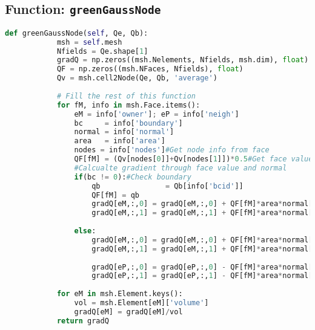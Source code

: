 \documentclass{article}
\begin{document}
\subsection*{Function: \texttt{greenGaussNode}}
\begin{lstlisting}[language=Python]
    def greenGaussNode(self, Qe, Qb):
            msh = self.mesh
            Nfields = Qe.shape[1]
            gradQ = np.zeros((msh.Nelements, Nfields, msh.dim), float)
            QF = np.zeros((msh.NFaces, Nfields), float)
            Qv = msh.cell2Node(Qe, Qb, 'average')
            
            # Fill the rest of this function
            for fM, info in msh.Face.items():
                eM = info['owner']; eP = info['neigh']
                bc     = info['boundary']
                normal = info['normal']
                area   = info['area']
                nodes = info['nodes']#Get node info from face
                QF[fM] = (Qv[nodes[0]]+Qv[nodes[1]])*0.5#Get face value through nodes
                #Calcualte gradient through face value and normal
                if(bc != 0):#Check boundary
                    qb               = Qb[info['bcid']]
                    QF[fM] = qb
                    gradQ[eM,:,0] = gradQ[eM,:,0] + QF[fM]*area*normal[0]
                    gradQ[eM,:,1] = gradQ[eM,:,1] + QF[fM]*area*normal[1]
                    
                else:
                    gradQ[eM,:,0] = gradQ[eM,:,0] + QF[fM]*area*normal[0]
                    gradQ[eM,:,1] = gradQ[eM,:,1] + QF[fM]*area*normal[1]
                                
                    gradQ[eP,:,0] = gradQ[eP,:,0] - QF[fM]*area*normal[0]
                    gradQ[eP,:,1] = gradQ[eP,:,1] - QF[fM]*area*normal[1]
            
            for eM in msh.Element.keys():
                vol = msh.Element[eM]['volume']
                gradQ[eM] = gradQ[eM]/vol
            return gradQ
\end{lstlisting}
\end{document}
